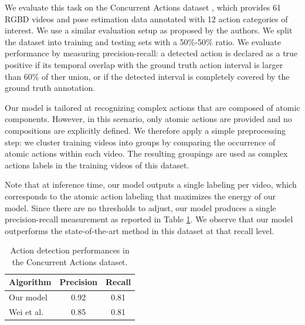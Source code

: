 We evaluate this task on the Concurrent Actions dataset \cite{Wei2013},
which
provides 61 RGBD videos and pose estimation data annotated with 12
action categories of interest.
We use a similar evaluation setup as proposed by the authors.
We split the dataset into training and testing sets with a 50\%-50\% ratio.
We evaluate performance by measuring precision-recall: a detected action
is declared as a true positive if its temporal overlap with the ground
truth action interval is larger than 60\% of ther union, or if
the detected interval is completely covered by the ground truth annotation.

Our model is tailored at recognizing complex actions that are composed
of atomic components. However, in this scenario, only atomic actions are
provided and no compositions are explicitly defined. We therefore apply
a simple preprocessing step: we cluster training videos into groups
by comparing the occurrence of atomic actions within each video.
The resulting groupings are used as complex actions labels in the training
videos of this dataset.

Note that at inference time, our model outputs a single labeling per video,
which corresponds to the atomic action labeling that maximizes the energy of
our model.
Since there are no thresholds to adjust, our model produces a single
precision-recall measurement as reported in Table \ref{tab:concurrent}.
We observe that our model outperforms the state-of-the-art method in this
dataset at that recall level.





\begin{table}[tb]
\footnotesize
\centering
\begin{tabular}{|l|c|c|}
\hline
\textbf{Algorithm} & \textbf{Precision} & \textbf{Recall}\\
\hline
Our model &  0.92 & 0.81 \\
\hline
Wei et al. \cite{Wei2013} & 0.85 & 0.81 \\
\hline
\end{tabular}
\caption{
\footnotesize
Action detection performances in the Concurrent Actions dataset. }
\label{tab:concurrent}
\vspace{-3mm}
\end{table}
 
